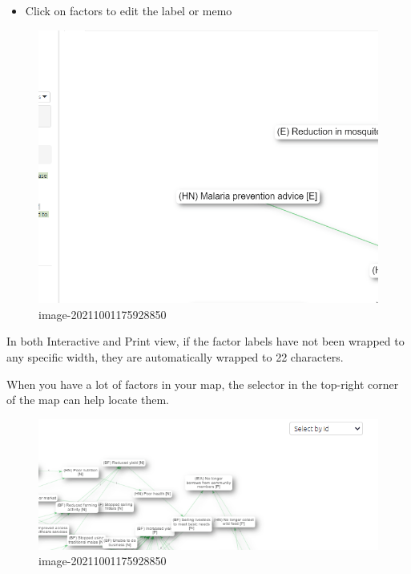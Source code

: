 \documentclass[
]{book}
\providecommand{\tightlist}{%
  \setlength{\itemsep}{0pt}\setlength{\parskip}{0pt}}
\begin{document}
\begin{itemize}
\tightlist
\item
  Click on factors to edit the label or memo
\end{itemize}

\begin{figure}
\centering
\includegraphics[width=6.77083in,height=\textheight]{_assets/edit.gif}
\caption{image-20211001175928850}
\end{figure}

In both Interactive and Print view, if the factor labels have not been wrapped to any specific width, they are automatically wrapped to 22 characters.

When you have a lot of factors in your map, the selector in the top-right corner of the map can help locate them.

\begin{figure}
\centering
\includegraphics[width=6.77083in,height=\textheight]{_assets/nodeselect.gif}
\caption{image-20211001175928850}
\end{figure}
\end{document}
